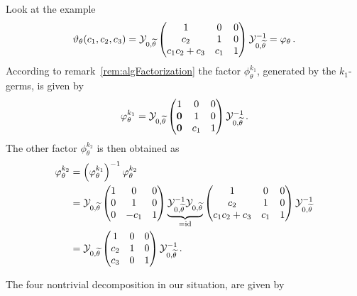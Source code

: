\begin{exmp}\label{exmp:decompositionHere}
  Look at the example
  \[
    \vartheta_\theta(c_1,c_2,c_3)=
    \mathcal{Y}_{0,\widetilde\theta}
    \begin{pmatrix} 1 & 0 & 0 \\c_2 & 1 & 0 \\c_1c_2+c_3 & c_1 & 1 \end{pmatrix}
    \mathcal{Y}_{0,\widetilde\theta}^{-1}
    =\varphi_\theta
    \,.
  \]
  According to remark~\ref{rem:algFactorization} the factor
  $\phi_\theta^{k_1}$, generated by the $k_1$-germs, is given by
  \[
    \varphi_\theta^{k_1}=
    \mathcal{Y}_{0,\widetilde\theta}
    \begin{pmatrix}
      1 & 0 & 0
    \\\text{\boldmath $0$} & 1 & 0
    \\\text{\boldmath $0$} & c_1 & 1
    \end{pmatrix}
    \mathcal{Y}_{0,\widetilde\theta}^{-1}
    \,.
  \]
  The other factor $\phi_\theta^{k_2}$ is then obtained as
  \begin{align*}
    \phi_\theta^{k_2}&=
    \left(\phi_\theta^{k_1}\right)^{-1}
    \phi_\theta^{k_2}
  \\&=\cY_{0,\tilde\theta}
    \begin{pmatrix}
      1     & 0    & 0
    \\0     & 1    & 0
    \\0     & -c_1 & 1
    \end{pmatrix}
    \underset{=\id}{\underbrace{%
        \cY_{0,\tilde\theta}^{-1}
        \cY_{0,\tilde\theta}
    }}
    \begin{pmatrix} 1 & 0 & 0 \\c_2 & 1 & 0 \\c_1c_2+c_3 & c_1 & 1 \end{pmatrix}
    \cY_{0,\tilde\theta}^{-1}
  \\&=\cY_{0,\tilde\theta}
    \begin{pmatrix}
      1     & 0 & 0
    \\c_2     & 1          & 0
    \\c_3     & 0          & 1
    \end{pmatrix}
    \cY_{0,\tilde\theta}^{-1}
    \,.
  \end{align*}
\end{exmp}
The four nontrivial decomposition in our situation, are given by
